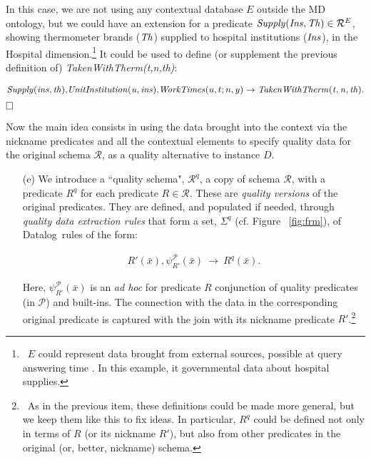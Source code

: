 \documentclass[format=acmsmall, review=false, screen=true]{acmart}
\newcommand{\boxtheorem}{\ensuremath{\hfill \Box}}
\newcommand{\mc}[1]{\mathcal{ #1}}
\newcommand{\nit}[1]{{\it #1}}
\newcommand{\da}{Datalog}
\newcommand{\vectt}[1]{\bar{#1}}
\begin{document}
\begin{example}
In this case, we are not using  any contextual database $E$ outside the MD ontology, but we could have an extension for a predicate $\nit{Supply(Ins,Th)} \in \mc{R}^E$, showing thermometer brands ($\nit{Th}$) supplied to hospital institutions ($\nit{Ins}$), in the {\sf Hospital} dimension.\footnote{\ $E$ could represent data brought from external sources, possible at query answering time \cite{bertossi-brite,bertossi16}. In this example, it governmental data about hospital supplies.} It could be used to define (or supplement the previous definition of) {\it TakenWithTherm(t,n,th)}:

\vspace{-4mm}
\begin{align}
\nit{Supply(ins,th),\!UnitInstitution(u,ins)},\!\nit{WorkTimes}(u,t;n,y) \rightarrow {\it TakenWithTherm(t,n,th)}.\label{eq:second}
\end{align}
\boxtheorem\end{example}

Now the main idea consists in using the data brought into the context via the nickname predicates and all the contextual elements to specify quality data for the original schema $\mc{R}$, as a quality alternative to instance $D$.



\begin{itemize}
\item[(e)]
We introduce a ``quality schema", $\mc{R}^q$, a copy of schema $\mc{R}$, with a predicate $R^q$ for each predicate $R \in \mc{R}$. These are
{\em quality versions} of the original predicates. They are defined, and populated if needed, through {\em quality data extraction rules} that form a set, $\Sigma^q$ (cf. Figure ~\ref{fig:frm}), of \da \ rules of the form:



\vspace{-4mm}
\begin{align}
R'(\vectt{x}),\psi^\mc{P}_{R'}(\vectt{x})~\rightarrow~R^q(\vectt{x}).\label{frm:qvd}
\end{align}
\vspace{-4mm}

\noindent Here, $\psi^\mc{P}_{R'}(\vectt{x})$ is an {\em ad hoc} for predicate $R$  conjunction of  quality predicates (in $\mc{P}$) and built-ins. The connection with the data in the corresponding original predicate is captured with the join with its nickname predicate $R'$.\footnote{\ As in the previous item, these definitions could be made more general, but we keep them like this to fix ideas. In particular,  $R^q$ could be defined not only in terms of $R$ (or its nickname $R'$), but also from other predicates in the original (or, better, nickname) schema.}
\end{itemize}
\end{document}

